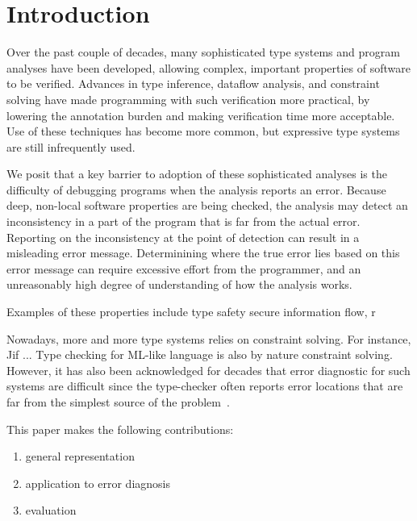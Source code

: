 \begin{abstract}

\end{abstract}

\section{Introduction}

Over the past couple of decades, many sophisticated type systems and
program analyses have been developed, allowing complex, important
properties of software to be verified. Advances in type
inference, dataflow analysis, and constraint solving have made
programming with such verification more practical, by lowering the
annotation burden and making verification time more acceptable.
Use of these techniques has become more common, but expressive
type systems are still infrequently used.

We posit that a key barrier to adoption of these sophisticated
analyses is the difficulty of debugging programs when the analysis
reports an error. Because deep, non-local software properties are
being checked, the analysis may detect an inconsistency in a part of
the program that is far from the actual error. Reporting on the
inconsistency at the point of detection can result in a misleading
error message. Determinining where the true error lies based on this
error message can require excessive effort from the programmer, and an
unreasonably high degree of understanding of how the analysis works.

Examples of these properties include
type safety
secure information flow, r
 
Nowadays, more and more type systems relies on constraint solving. For
instance, Jif ... Type checking for ML-like language is also by nature
constraint solving. However, it has also been acknowledged for
decades that error diagnostic for such systems are difficult
since the type-checker often reports error locations that are far from the
simplest source of the problem~\cite{wand-errorfinding}.


This paper makes the following contributions:

\begin{enumerate}
\item
general representation

\item
application to error diagnosis

\item
evaluation
\end{enumerate}

